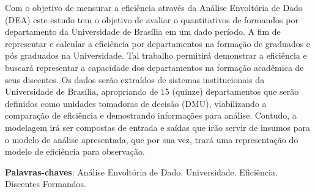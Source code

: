 \begin{resumo}
Com o objetivo de mensurar a eficiência através da Análise Envoltória de Dado (DEA) este estudo tem o objetivo de avaliar o quantitativos de formandos por departamento da Universidade de Brasília em um dado período. A fim de representar e calcular a eficiência por departamentos na formação de graduados e pós graduados na Universidade. Tal trabalho permitirá demonstrar a eficiência e buscará representar a capacidade dos departamentos na formação acadêmica de seus discentes. Os dados serão extraídos de sistemas institucionais da Universidade de Brasília, apropriando de 15 (quinze) departamentos que serão definidos como unidades tomadoras de decisão (DMU), viabilizando a comparação de eficiência e demostrando informações para análise.
Contudo, a modelagem irá ser compostas de entrada e saídas que irão servir de insumos para o modelo de análise apresentada, que por sua vez, trará uma representação do modelo de eficiência para observação.

 \vspace{\onelineskip}
    
 \noindent
 \textbf{Palavras-chaves}: Análise Envoltória de Dado. Universidade. Eficiência. Discentes Formandos.
\end{resumo}
